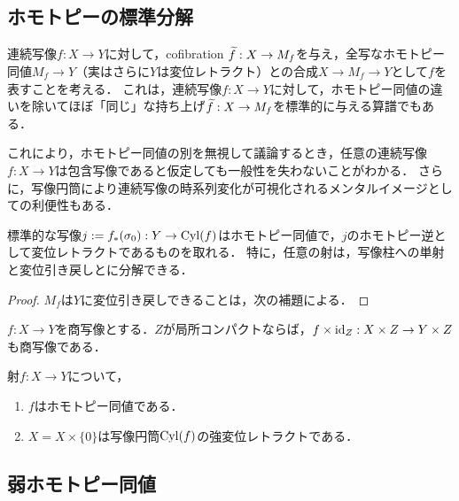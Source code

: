 \documentclass[uplatex,dvipdfmx]{jsreport}
\begin{document}
\subsection{ホモトピーの標準分解}

\begin{tcolorbox}[colframe=ForestGreen, colback=ForestGreen!10!white,breakable,colbacktitle=ForestGreen!40!white,coltitle=black,fonttitle=\bfseries\sffamily,
title=リフトとホモトピー同値とに分けて考える]
    連続写像$f:X\to Y$に対して，cofibration $\widetilde{f}:X\to M_f$を与え，全写なホモトピー同値$M_f\to Y$（実はさらに$Y$は変位レトラクト）との合成$X\to M_f\to Y$として$f$を表すことを考える．
    これは，連続写像$f:X\to Y$に対して，ホモトピー同値の違いを除いてほぼ「同じ」な持ち上げ$\widetilde{f}:X\to M_f$を標準的に与える算譜でもある．

    これにより，ホモトピー同値の別を無視して議論するとき，任意の連続写像$f:X\to Y$は包含写像であると仮定しても一般性を失わないことがわかる．
    さらに，写像円筒により連続写像の時系列変化が可視化されるメンタルイメージとしての利便性もある．
\end{tcolorbox}

\begin{theorem}[ホモトピー標準分解]\label{thm-cannonical-decomposition-of-continuous-map}
    標準的な写像$j:=f_*(\sigma_0):Y\to\mathrm{Cyl}(f)$はホモトピー同値で，$j$のホモトピー逆として変位レトラクトであるものを取れる．
    特に，任意の射は，写像柱への単射と変位引き戻しとに分解できる．
\end{theorem}
\begin{proof}
    $M_f$は$Y$に変位引き戻しできることは，次の補題による．
\end{proof}
\begin{lemma}[商空間と積空間]
    $f:X\to Y$を商写像とする．$Z$が局所コンパクトならば，$f\times\mathrm{id}_Z:X\times Z\to Y\times Z$も商写像である．
\end{lemma}

\begin{theorem}[ホモトピー同値の特徴付け]\label{thm-characterization-of-homotopy-equivalence}
    射$f:X\to Y$について，
    \begin{enumerate}
        \item $f$はホモトピー同値である．
        \item $X=X\times\{0\}$は写像円筒$\mathrm{Cyl}(f)$の強変位レトラクトである．
    \end{enumerate}
\end{theorem}

\subsection{弱ホモトピー同値}
\end{document}
